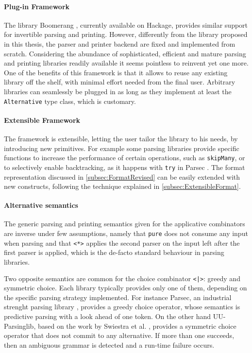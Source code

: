 \documentclass[../Thesis.tex]{subfiles}
\begin{document}
\paragraph{Plug-in Framework}
The library Boomerang \cite{Boomerang}, currently available on Hackage,
provides similar support for invertible parsing and printing.
However, differently from the library proposed in this thesis, the parser
and printer backend are fixed and implemented from scratch.
Considering the abundance of sophisticated, efficient and mature 
parsing and printing libraries readily available it seems pointless to reinvent yet one more.
One of the benefits of this framework is that it allows to reuse any
existing library off the shelf, with minimal effort needed from the
final user. Arbitrary libraries can seamlessly be plugged in as long as they 
implement at least the \texttt{Alternative} type class, which is 
customary.

\paragraph{Extensible Framework}
The framework is extensible, letting the user tailor the library to his needs, by
introducing new primitives.
For example some parsing libraries provide specific functions
to increase the performance of certain operations, such as \texttt{skipMany}, or to selectively enable backtracking, as it happens with \texttt{try} in Parsec \cite{Parsec}.
The format representation discussed in \ref{subsec:FormatRevised} can be 
easily extended with new constructs, following the technique explained in
\ref{subsec:ExtensibleFormat}.

\paragraph{Alternative semantics}
The generic parsing and printing semantics given for the applicative combinators are inverse under few assumptions,
namely that \texttt{pure} does not consume any input when parsing and that \texttt{<*>} applies the second parser on the input left after the first parser is applied, which is the de-facto standard behaviour in parsing libraries.

Two opposite semantics are common for the choice 
combinator \texttt{<|>}: greedy and symmetric choice. 
Each library typically provides only one of them, 
depending on the specific parsing strategy implemented.
For instance Parsec, an industrial strenght parsing library \cite{Parsec}, 
provides a greedy choice operator, whose semantics is predictive parsing
with a look ahead of one token. On the other hand UU-Parsinglib, based on the work by Swiestra et al. \cite{UUParsingLib}, provides a symmetric choice operator that does not commit to any alternative. If more than one succeeds, then an ambiguous grammar is detected and a run-time failure occurs.
\end{document}
